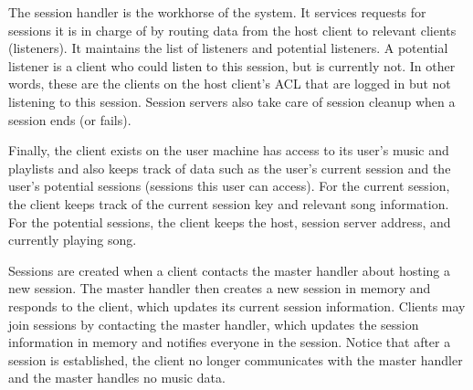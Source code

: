 The session handler is the workhorse of the system. It 
services requests for sessions it is in charge of by 
routing data from the host client to relevant clients 
(listeners). It maintains the list of listeners and 
potential listeners. A potential listener is a client 
who could listen to this session, but is currently not. 
In other words, these are the clients on the host client's 
ACL that are logged in but not listening to this 
session. Session servers also take care of session 
cleanup when a session ends (or fails). 

Finally, the client exists on the user machine 
has access to its user's music and playlists and 
also keeps track of data such as the user's current 
session and the user's potential sessions (sessions 
this user can access). For the current session, the 
client keeps track of the current session key and relevant song information. 
For the potential sessions, the client keeps the host, 
session server address, and currently playing song.

Sessions are created when a client contacts the master 
handler about hosting a new session. The master handler 
then creates a new session in memory and responds to the client, 
which updates its current session information. 
Clients may join sessions by contacting the master 
handler, which updates the session information in memory
and notifies everyone in the session. Notice that after a session 
is established, the client no longer communicates 
with the master handler and the master handles 
no music data. 
